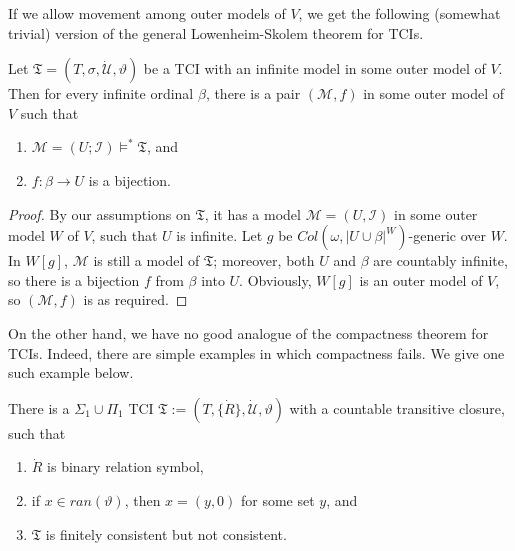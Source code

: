 \documentclass[12pt]{article}
\numberwithin{equation}{section}
\begin{document}
If we allow movement among outer models of $V$, we get the following (somewhat trivial) version of the general Lowenheim-Skolem theorem for TCIs.

\begin{lem}\label{GLS}
Let $\mathfrak{T} = (T, \sigma, \dot{\mathcal{U}}, \vartheta)$ be a TCI with an infinite model in some outer model of $V$. Then for every infinite ordinal $\beta$, there is a pair $(\mathcal{M}, f)$ in some outer model of $V$ such that 
\begin{enumerate}[label=(\alph*)]
    \item $\mathcal{M} = (U; \mathcal{I}) \models^* \mathfrak{T}$, and
    \item $f : \beta \longrightarrow U$ is a bijection.
\end{enumerate}
\end{lem}

\begin{proof}
By our assumptions on $\mathfrak{T}$, it has a model $\mathcal{M} = (U, \mathcal{I})$ in some outer model $W$ of $V$, such that $U$ is infinite. Let $g$ be $Col(\omega, |U \cup \beta|^W)$-generic over $W$. In $W[g]$, $\mathcal{M}$ is still a model of $\mathfrak{T}$; moreover, both $U$ and $\beta$ are countably infinite, so there is a bijection $f$ from $\beta$ into $U$. Obviously, $W[g]$ is an outer model of $V$, so $(\mathcal{M}, f)$ is as required.
\end{proof}

On the other hand, we have no good analogue of the compactness theorem for TCIs. Indeed, there are simple examples in which compactness fails. We give one such example below.

\begin{lem}\label{countercom}
There is a $\Sigma_1 \cup \Pi_1$ TCI $\mathfrak{T} := (T, \{\dot{R}\}, \dot{\mathcal{U}}, \vartheta)$ with a countable transitive closure, such that
\begin{enumerate}[label=(\alph*)]
    \item $\dot{R}$ is binary relation symbol, 
    \item if $x \in ran(\vartheta)$, then $x = (y, 0)$ for some set $y$, and
    \item $\mathfrak{T}$ is finitely consistent but not consistent.
\end{enumerate}
\end{lem}
\end{document}
